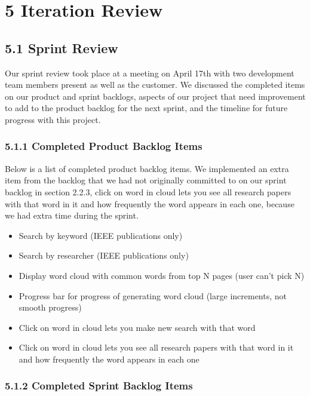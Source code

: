 \documentclass[]{article}
\begin{document}
\section{5 Iteration Review}\label{iteration-review}

\subsection{5.1 Sprint Review}\label{sprint-review}

Our sprint review took place at a meeting on April 17th with two
development team members present as well as the customer. We discussed
the completed items on our product and sprint backlogs, aspects of our
project that need improvement to add to the product backlog for the next
sprint, and the timeline for future progress with this project.

\subsubsection{5.1.1 Completed Product Backlog
Items}\label{completed-product-backlog-items}

Below is a list of completed product backlog items. We implemented an
extra item from the backlog that we had not originally committed to on
our sprint backlog in section 2.2.3, click on word in cloud lets you see
all research papers with that word in it and how frequently the word
appears in each one, because we had extra time during the sprint.

\begin{itemize}
\itemsep1pt\parskip0pt
\item
  Search by keyword (IEEE publications only)
\item
  Search by researcher (IEEE publications only)
\item
  Display word cloud with common words from top N pages (user can't pick
  N)
\item
  Progress bar for progress of generating word cloud (large increments,
  not smooth progress)
\item
  Click on word in cloud lets you make new search with that word
\item
  Click on word in cloud lets you see all research papers with that word
  in it and how frequently the word appears in each one
\end{itemize}

\subsubsection{5.1.2 Completed Sprint Backlog
Items}\label{completed-sprint-backlog-items}
\end{document}
